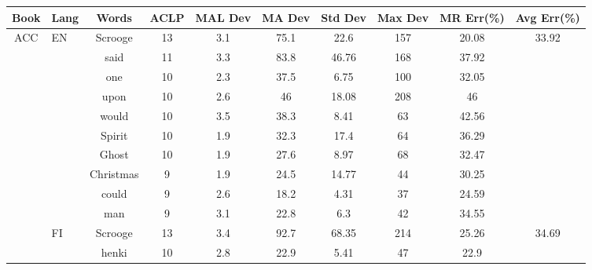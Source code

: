 \documentclass[shortpaper]{revdetua}
\begin{document}
\begin{table}[H]
\centering 
\begin{tabular}{@{}cccccccccc@{}}
\toprule
\textbf{Book} & \multicolumn{1}{l|}{\textbf{Lang}} & \textbf{Words} & \textbf{ACLP} & \textbf{MAL Dev} & \textbf{MA Dev} & \textbf{Std Dev} & \textbf{Max Dev} & \textbf{MR Err(\%)} & \textbf{Avg Err(\%)} \\ \midrule
ACC  & \multicolumn{1}{l|}{EN} & Scrooge     & 13           & 3.1              & 75.1         & 22.6    & 157     & 20.08             & 33.92        \\
     & \multicolumn{1}{l|}{}   & said        & 11           & 3.3              & 83.8         & 46.76   & 168     & 37.92             &              \\
     & \multicolumn{1}{l|}{}   & one         & 10           & 2.3              & 37.5         & 6.75    & 100     & 32.05             &              \\
     & \multicolumn{1}{l|}{}   & upon        & 10           & 2.6              & 46           & 18.08   & 208     & 46                &              \\
     & \multicolumn{1}{l|}{}   & would       & 10           & 3.5              & 38.3         & 8.41    & 63      & 42.56             &              \\
     & \multicolumn{1}{l|}{}   & Spirit      & 10           & 1.9              & 32.3         & 17.4    & 64      & 36.29             &              \\
     & \multicolumn{1}{l|}{}   & Ghost       & 10           & 1.9              & 27.6         & 8.97    & 68      & 32.47             &              \\
     & \multicolumn{1}{l|}{}   & Christmas   & 9            & 1.9              & 24.5         & 14.77   & 44      & 30.25             &              \\
     & \multicolumn{1}{l|}{}   & could       & 9            & 2.6              & 18.2         & 4.31    & 37      & 24.59             &              \\
     & \multicolumn{1}{l|}{}   & man         & 9            & 3.1              & 22.8         & 6.3     & 42      & 34.55             &              \\ \cmidrule(l){2-10} 
     & \multicolumn{1}{l|}{FI} & Scrooge     & 13           & 3.4              & 92.7         & 68.35   & 214     & 25.26             & 34.69        \\
     & \multicolumn{1}{l|}{}   & henki       & 10           & 2.8              & 22.9         & 5.41    & 47      & 22.9              &              \\

\end{tabular}
\end{table}
\end{document}
